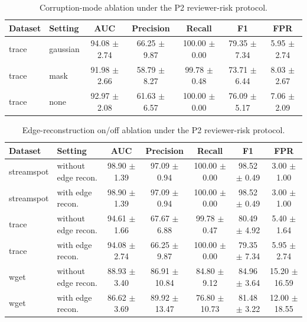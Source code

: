 \begin{table}[t]
\centering
\small
\caption{Corruption-mode ablation under the P2 reviewer-risk protocol.}
\label{tab:p2_corruption}
\begin{tabular}{llccccc}
\toprule
Dataset & Setting & AUC & Precision & Recall & F1 & FPR\\
\midrule
trace & gaussian & 94.08 $\pm$ 2.74 & 66.25 $\pm$ 9.87 & 100.00 $\pm$ 0.00 & 79.35 $\pm$ 7.34 & 5.95 $\pm$ 2.74\\
trace & mask & 91.98 $\pm$ 2.66 & 58.79 $\pm$ 8.27 & 99.78 $\pm$ 0.48 & 73.71 $\pm$ 6.44 & 8.03 $\pm$ 2.67\\
trace & none & 92.97 $\pm$ 2.08 & 61.63 $\pm$ 6.57 & 100.00 $\pm$ 0.00 & 76.09 $\pm$ 5.17 & 7.06 $\pm$ 2.09\\
\bottomrule
\end{tabular}
\end{table}

\begin{table}[t]
\centering
\small
\caption{Edge-reconstruction on/off ablation under the P2 reviewer-risk protocol.}
\label{tab:p2_edge_recon}
\begin{tabular}{llccccc}
\toprule
Dataset & Setting & AUC & Precision & Recall & F1 & FPR\\
\midrule
streamspot & without edge recon. & 98.90 $\pm$ 1.39 & 97.09 $\pm$ 0.94 & 100.00 $\pm$ 0.00 & 98.52 $\pm$ 0.49 & 3.00 $\pm$ 1.00\\
streamspot & with edge recon. & 98.90 $\pm$ 1.39 & 97.09 $\pm$ 0.94 & 100.00 $\pm$ 0.00 & 98.52 $\pm$ 0.49 & 3.00 $\pm$ 1.00\\
trace & without edge recon. & 94.61 $\pm$ 1.66 & 67.67 $\pm$ 6.88 & 99.78 $\pm$ 0.47 & 80.49 $\pm$ 4.92 & 5.40 $\pm$ 1.64\\
trace & with edge recon. & 94.08 $\pm$ 2.74 & 66.25 $\pm$ 9.87 & 100.00 $\pm$ 0.00 & 79.35 $\pm$ 7.34 & 5.95 $\pm$ 2.74\\
wget & without edge recon. & 88.93 $\pm$ 3.40 & 86.91 $\pm$ 10.84 & 84.80 $\pm$ 9.12 & 84.96 $\pm$ 3.64 & 15.20 $\pm$ 16.59\\
wget & with edge recon. & 86.62 $\pm$ 3.69 & 89.92 $\pm$ 13.47 & 76.80 $\pm$ 10.73 & 81.48 $\pm$ 3.22 & 12.00 $\pm$ 18.55\\
\bottomrule
\end{tabular}
\end{table}
